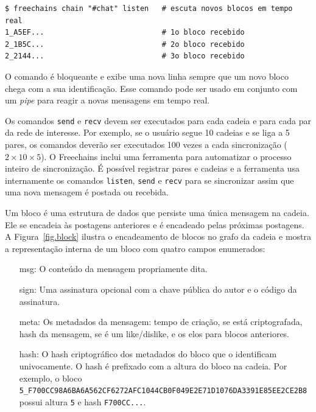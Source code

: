 \documentclass[12pt]{article}
\newcommand{\FC} {Freechains\xspace}
\begin{document}
{\footnotesize
\begin{verbatim}
$ freechains chain "#chat" listen   # escuta novos blocos em tempo real
1_A5EF...                           # 1o bloco recebido
2_1B5C...                           # 2o bloco recebido
2_2144...                           # 3o bloco recebido
\end{verbatim}
}

O comando é bloqueante e exibe uma nova linha sempre que um novo bloco chega
com a sua identificação.
Esse comando pode ser usado em conjunto com um \emph{pipe} para reagir a novas
mensagens em tempo real.

Os comandos \texttt{send} e \texttt{recv} devem ser executados para cada cadeia
e para cada par da rede de interesse.
Por exemplo, se o usuário segue 10 cadeias e se liga a 5 pares, os comandos
deverão ser executados 100 vezes a cada sincronização ($2\times10\times5$).
O \FC inclui uma ferramenta para automatizar o processo inteiro de
sincronização.
É possível registrar pares e cadeias e a ferramenta usa internamente os
comandos \texttt{listen}, \texttt{send} e \texttt{recv} para se sincronizar
assim que uma nova mensagem é postada ou recebida.

Um bloco é uma estrutura de dados que persiste uma única mensagem na cadeia.
Ele se encadeia às postagens anteriores e é encadeado pelas próximas postagens.
A Figura~\ref{fig.block} ilustra o encadeamento de blocos no grafo da cadeia e
mostra a representação interna de um bloco com quatro campos enumerados:

\begin{enumerate}
\item[msg:]  O conteúdo da mensagem propriamente dita.
\item[sign:] Uma assinatura opcional com a chave pública do autor e o código da
             assinatura.
\item[meta:] Os metadados da mensagem: tempo de criação, se está criptografada,
             hash da mensagem, se é um like/dislike, e os elos para blocos
             anteriores.
\item[hash:] O hash criptográfico dos metadados do bloco que o identificam
             univocamente. O hash é prefixado com a altura do bloco na cadeia.
             Por exemplo, o bloco
                {\scriptsize\texttt{5\_F700CC98A6BA6A562CF6272AFC1044CB0F049E2E71D1076DA3391E85EE2CE2B8}}
             possui altura \texttt{5} e hash \texttt{F700CC...}.
\end{enumerate}
\end{document}
